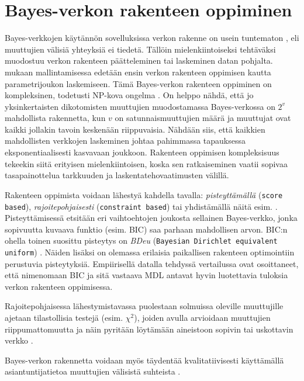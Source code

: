 \section{Bayes-verkon rakenteen oppiminen}
Bayes-verkkojen käytännön sovelluksissa verkon rakenne on usein tuntematon \citep{ruggeri_bayesian_2008}, eli muuttujien välisiä yhteyksiä ei tiedetä. Tällöin mielenkiintoiseksi tehtäväksi muodostuu verkon rakenteen päätteleminen tai laskeminen datan pohjalta. \citet{myllymaki_bayes-verkkojen_1998} mukaan mallintamisessa edetään ensin verkon rakenteen oppimisen kautta parametrijoukon laskemiseen. Tämä Bayes-verkon rakenteen oppiminen on kompleksinen, todetusti NP-kova ongelma \citep{chickering_large-sample_2004}. On helppo nähdä, että jo yksinkertaisten dikotomisten muuttujien muodostamassa Bayes-verkossa on $2^v$ mahdollista rakennetta, kun $v$ on satunnaismuuttujien määrä ja muuttujat ovat kaikki jollakin tavoin keskenään riippuvaisia. Nähdään siis, että kaikkien mahdollisten verkkojen laskeminen johtaa pahimmassa tapauksessa eksponentiaalisesti kasvavaan joukkoon. Rakenteen oppimisen kompleksisuus tekeekin siitä erityisen mielenkiintoisen, koska sen ratkaiseminen vaatii sopivaa tasapainottelua tarkkuuden ja laskentatehovaatimusten välillä.

Rakenteen oppimista voidaan lähestyä kahdella tavalla: \emph{pisteyttämällä} (\texttt{score based}),  \emph{rajoitepohjaisesti} (\texttt{constraint based}) \citep{ramsahai_connecting_2020, scutari_learning_2010} tai yhdistämällä näitä esim. \citep{li_hybrid_2018}. Pisteyttämisessä etsitään eri vaihtoehtojen joukosta sellainen Bayes-verkko, jonka sopivuutta kuvaava funktio (esim. BIC) saa parhaan mahdollisen arvon. BIC:n ohella toinen suosittu pisteytys on \emph{BDeu} (\texttt{Bayesian Dirichlet equivalent uniform})  \citep{scanagatta_survey_2019}. Näiden lisäksi on olemassa erilaisia paikallisen rakenteen optimointiin perustuvia pisteytyksiä. Empiirisellä datalla  tehdyssä vertailussa \citet{liu_empirical_2012} ovat osoittaneet, että nimenomaan BIC ja sitä vastaava MDL antavat hyvin luotettavia tuloksia verkon rakenteen oppimisessa. 

Rajoitepohjaisessa lähestymistavassa puolestaan solmuissa oleville muuttujille ajetaan tilastollisia testejä (esim. $\chi^2$), joiden avulla arvioidaan muuttujien riippumattomuutta ja näin pyritään löytämään aineistoon sopivin tai uskottavin verkko \citep{ramsahai_connecting_2020, scutari_learning_2010}. 

Bayes-verkon rakennetta voidaan myös täydentää kvalitatiivisesti käyttämällä asiantuntijatietoa muuttujien välisistä suhteista \citep{ruggeri_bayesian_2008, myllymaki_bayes-verkkojen_1998}. 

